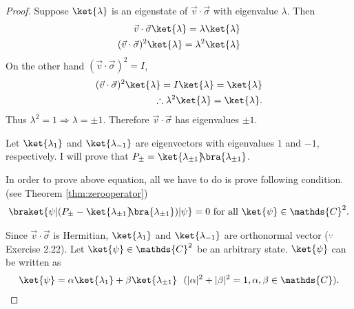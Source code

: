 \documentclass[10pt]{book}
\newcommand{\kb}[1]{\ket{#1}\hspace{-1mm} \bra{#1}} %
\begin{document}
	
	\begin{proof}
		Suppose $\ket{\lambda}$ is an eigenstate of $\vec{v} \cdot \vec{\sigma}$ with eigenvalue $\lambda$. Then
		\begin{equation}
\begin{aligned}
			\vec{v} \cdot \vec{\sigma} \ket{\lambda} = \lambda \ket{\lambda}\\
			(\vec{v} \cdot \vec{\sigma})^2 \ket{\lambda} = \lambda^2 \ket{\lambda}
		\end{aligned}
\end{equation}
		On the other hand $(\vec{v} \cdot \vec{\sigma})^2 = I$,
		\begin{equation}
\begin{aligned}
			(\vec{v} \cdot \vec{\sigma})^2 \ket{\lambda} = I \ket{\lambda} = \ket{\lambda}\\
			\therefore \lambda^2\ket{\lambda} = \ket{\lambda}.
		\end{aligned}
\end{equation}
		Thus $\lambda^2 = 1 \Rightarrow \lambda = \pm 1$. Therefore $\vec{v} \cdot \vec{\sigma}$ has eigenvalues $\pm 1$.
		
		Let $\ket{\lambda_1}$ and $\ket{\lambda_{-1}}$ are eigenvectors with eigenvalues $1$ and $-1$, respectively.
		I will prove that $P_\pm = \kb{\lambda_{\pm 1}}$.
		
		In order to prove above equation, all we have to do is prove following condition. (see Theorem \ref{thm:zerooperator})
		\begin{equation}
						\begin{aligned}
				\braket{\psi | (P_\pm - \kb{\lambda_{\pm 1}})| \psi} = 0 \text{ for all } \ket{\psi} \in \mathds{C}^2.
			\end{aligned}
		\end{equation}

		
		
		Since $\vec{v} \cdot \vec{\sigma}$ is Hermitian, $\ket{\lambda_1}$ and $\ket{\lambda_{-1}}$ are orthonormal vector ($\because $ Exercise 2.22).
		Let $\ket{\psi} \in \mathds{C}^2$ be an arbitrary state. $\ket{\psi}$ can be written as
		\begin{equation}
\begin{aligned}
			\ket{\psi} = \alpha \ket{\lambda_1} + \beta \ket{\lambda_{\pm 1}} ~~(|\alpha|^2 + |\beta|^2 = 1, \alpha, \beta \in \mathds{C}).
		\end{aligned}
\end{equation}
		

\end{proof}
\end{document}
